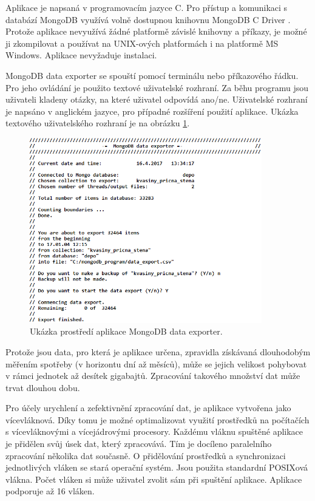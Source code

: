 Aplikace je napsaná v programovacím jazyce C. Pro přístup a komunikaci s databází MongoDB využívá volně dostupnou knihovnu MongoDB C Driver \cite{mongocdriver}. Protože aplikace nevyužívá žádné platformě závislé knihovny a příkazy, je možné ji zkompilovat a používat na UNIX-ových platformách i na platformě MS Windows. Aplikace nevyžaduje instalaci. 

MongoDB data exporter se spouští pomocí terminálu nebo příkazového řádku. Pro jeho ovládání je použito textové uživatelské rozhraní. Za běhu programu jsou uživateli kladeny otázky, na které uživatel odpovídá ano/ne. Uživatelské rozhraní je napsáno v anglickém jazyce, pro případné rozšíření použití aplikace. Ukázka textového uživatelského rozhraní je na obrázku \ref{ukazka_run_pic}.
\\
\begin{figure}[ht]
    \includegraphics[width=0.9\textwidth]{ukazka_run}
    \caption{Ukázka prostředí aplikace MongoDB data exporter.}
    \label{ukazka_run_pic}
\end{figure}

Protože jsou data, pro která je aplikace určena, zpravidla získávaná dlouhodobým měřením spotřeby (v horizontu dní až měsíců), může se jejich velikost pohybovat v rámci jednotek až desítek gigabajtů. Zpracování takového množství dat může trvat dlouhou dobu. 

Pro účely urychlení a zefektivnění zpracování dat, je aplikace vytvořena jako vícevláknová. Díky tomu je možné optimalizovat využití prostředků na počítačích s vícevláknovými a vícejádrovými procesory. Každému vláknu spuštěné aplikace je přidělen svůj úsek dat, který zpracovává. Tím je docíleno paralelního zpracování několika dat současně. O přidělování prostředků a synchronizaci jednotlivých vláken se stará operační systém. Jsou použita standardní POSIXová vlákna. Počet vláken si může uživatel zvolit sám při spuštění aplikace. Aplikace podporuje až 16 vláken.       

